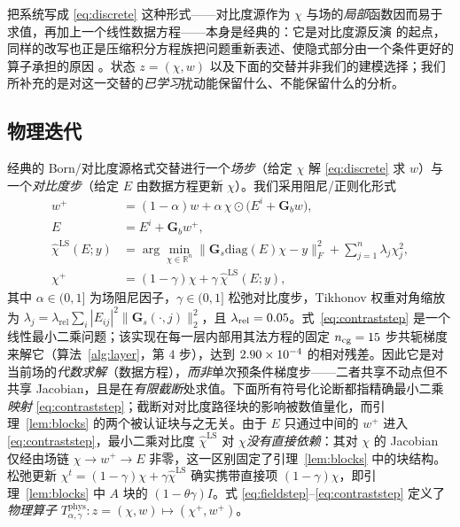 \documentclass[UTF8,a4paper,11pt]{ctexart}
\newcommand{\R}{\mathbb{R}}
\newcommand{\norm}[1]{\lVert #1 \rVert}
\newcommand{\numv}[1]{#1}
\begin{document}
把系统写成 \eqref{eq:discrete} 这种形式——对比度源作为 $\chi$ 与场的\emph{局部}函数因而易于求值，再加上一个线性数据方程——本身是经典的：它是对比度源反演 \cite{csi_lit} 的起点，同样的改写也正是压缩积分方程族把问题重新表述、使隐式部分由一个条件更好的算子承担的原因 \cite{cie_lit}。状态 $z=(\chi,w)$ 以及下面的交替并非我们的建模选择；我们所补充的是对这一交替的\emph{已学习}扰动能保留什么、不能保留什么的分析。

\subsection{物理迭代}
经典的 Born/对比度源格式交替进行一个\emph{场步}（给定 $\chi$ 解 \eqref{eq:discrete} 求 $w$）与一个\emph{对比度步}（给定 $E$ 由数据方程更新 $\chi$）。我们采用阻尼/正则化形式
\begin{align}
w^{+} &= (1-\alpha)w+\alpha\,\chi\odot\big(E^{i}+\mathbf{G}_b w\big),
\label{eq:fieldstep}\\
E &= E^{i}+\mathbf{G}_b w^{+},
\label{eq:Estep}\\
\hat\chi^{\mathrm{LS}}(E;y) &= \arg\min_{\chi\in\R^{n}}\big\|\mathbf{G}_s\mathrm{diag}(E)\chi-y\big\|_F^{2}+\sum_{j=1}^{n}\lambda_j\chi_j^{2},
\label{eq:contraststep}\\
\chi^{+} &= (1-\gamma)\chi+\gamma\,\hat\chi^{\mathrm{LS}}(E;y),
\label{eq:chiupd}
\end{align}
其中 $\alpha\in(0,1]$ 为场阻尼因子，$\gamma\in(0,1]$ 松弛对比度步，Tikhonov 权重对角缩放为
$\lambda_j=\lambda_{\mathrm{rel}}\sum_i|E_{ij}|^{2}\norm{\mathbf{G}_s(\cdot,j)}_2^{2}$，且
$\lambda_{\mathrm{rel}}=\numv{\NumLamRel}$。式~\eqref{eq:contraststep} 是一个线性最小二乘问题；该实现在每一层内部用其法方程的固定 $n_{\mathrm{cg}}=\numv{\NumNCg}$ 步共轭梯度来解它（算法~\ref{alg:layer}，第 4 步），达到 $\numv{\NumCgResidImpl}$ 的相对残差。因此它是对当前场的\emph{代数求解}（数据方程），\emph{而非}单次预条件梯度步——二者共享不动点但不共享 Jacobian，且是在\emph{有限截断}处求值。下面所有符号化论断都指精确最小二乘\emph{映射} \eqref{eq:contraststep}；截断对对比度路径块的影响被数值量化，而引理~\ref{lem:blocks} 的两个被认证块与之无关。由于 $E$ 只通过中间的 $w^{+}$ 进入 \eqref{eq:contraststep}，最小二乘对比度 $\hat\chi^{\mathrm{LS}}$ 对 $\chi$\emph{没有直接依赖}：其对 $\chi$ 的 Jacobian 仅经由场链
$\chi\to w^{+}\to E$ 非零，这一区别固定了引理~\ref{lem:blocks} 中的块结构。松弛更新 $\chi^{t}=(1-\gamma)\chi+\gamma\hat\chi^{\mathrm{LS}}$ 确实携带直接项 $(1-\gamma)\chi$，即引理~\ref{lem:blocks} 中 $A$ 块的 $(1-\theta\gamma)I$。式 \eqref{eq:fieldstep}--\eqref{eq:contraststep} 定义了\emph{物理算子}
$T^{\mathrm{phys}}_{\alpha,\gamma}: z=(\chi,w)\mapsto(\chi^{+},w^{+})$。
\end{document}
